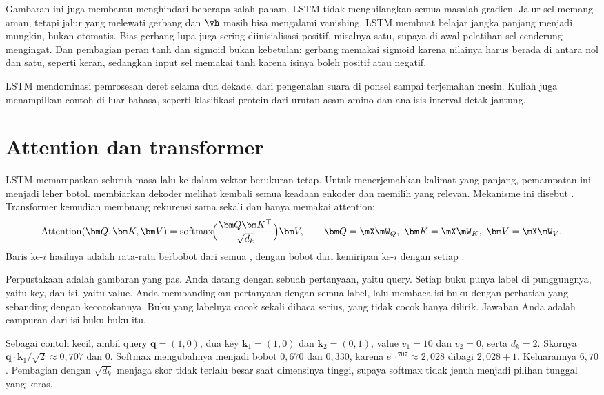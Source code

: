 Gambaran ini juga membantu menghindari beberapa salah paham. LSTM tidak menghilangkan semua
masalah gradien. Jalur sel memang aman, tetapi jalur yang melewati gerbang dan $\vh$ masih bisa
mengalami vanishing. LSTM membuat belajar jangka panjang menjadi mungkin, bukan otomatis. Bias
gerbang lupa juga sering diinisialisasi positif, misalnya satu, supaya di awal pelatihan sel
cenderung mengingat. Dan pembagian peran tanh dan sigmoid bukan kebetulan: gerbang memakai sigmoid
karena nilainya harus berada di antara nol dan satu, seperti keran, sedangkan input sel memakai
tanh karena isinya boleh positif atau negatif.

LSTM mendominasi pemrosesan deret selama dua dekade, dari pengenalan suara di ponsel sampai
terjemahan mesin. Kuliah juga menampilkan contoh di luar bahasa, seperti klasifikasi protein dari
urutan asam amino dan analisis interval detak jantung.

\section{Attention dan transformer}

LSTM memampatkan seluruh masa lalu ke dalam vektor berukuran tetap. Untuk menerjemahkan kalimat
yang panjang, pemampatan ini menjadi leher botol. \citet{bahdanau2015} membiarkan dekoder melihat
kembali semua keadaan enkoder dan memilih yang relevan. Mekanisme ini disebut
. Transformer \citep{vaswani2017} kemudian membuang rekurensi sama sekali dan hanya
memakai attention:
\begin{equation}
\mathrm{Attention}(\bm Q,\bm K,\bm V)=\mathrm{softmax}\!\Big(\frac{\bm Q\bm K^\top}{\sqrt{d_k}}\Big)\bm V,
\qquad \bm Q=\mX\mW_Q,\ \bm K=\mX\mW_K,\ \bm V=\mX\mW_V.
\end{equation}
Baris ke-$i$ hasilnya adalah rata-rata berbobot dari semua , dengan bobot dari
kemiripan  ke-$i$ dengan setiap .

Perpustakaan adalah gambaran yang pas. Anda datang dengan sebuah pertanyaan, yaitu query. Setiap
buku punya label di punggungnya, yaitu key, dan isi, yaitu value. Anda membandingkan pertanyaan
dengan semua label, lalu membaca isi buku dengan perhatian yang sebanding dengan kecocokannya.
Buku yang labelnya cocok sekali dibaca serius, yang tidak cocok hanya dilirik. Jawaban Anda
adalah campuran dari isi buku-buku itu.

Sebagai contoh kecil, ambil query $\bm q=(1,0)$, dua key $\bm k_1=(1,0)$ dan $\bm k_2=(0,1)$, value
$v_1=10$ dan $v_2=0$, serta $d_k=2$. Skornya $\bm q\cdot\bm k_1/\sqrt2\approx0{,}707$ dan $0$.
Softmax mengubahnya menjadi bobot $0{,}670$ dan $0{,}330$, karena $e^{0{,}707}\approx2{,}028$
dibagi $2{,}028+1$. Keluarannya $6{,}70$. Pembagian dengan $\sqrt{d_k}$ menjaga skor tidak terlalu
besar saat dimensinya tinggi, supaya softmax tidak jenuh menjadi pilihan tunggal yang keras.

